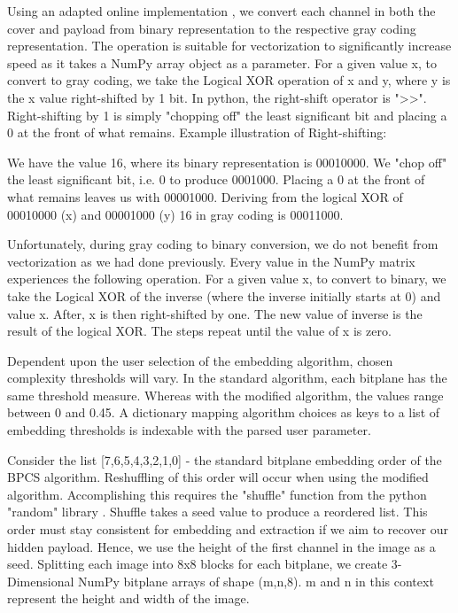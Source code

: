 \documentclass{l4proj}
\begin{document}
Using an adapted online implementation \citep{gray-code-conversion}, we convert each channel in both the cover and payload from binary representation to the respective gray coding representation. The operation is suitable for vectorization to significantly increase speed as it takes a NumPy array object as a parameter.  For a given value x, to convert to gray coding, we take the Logical XOR operation of x and y, where y is the x value right-shifted by 1 bit. In python, the right-shift operator is ">>". Right-shifting by 1 is simply "chopping off" the least significant bit and placing a 0 at the front of what remains. Example illustration of Right-shifting:

We have the value 16, where its binary representation is 00010000. We "chop off" the least significant bit, i.e. 0 to produce 0001000. Placing a 0 at the front of what remains leaves us with 00001000. Deriving from the logical XOR of 00010000 (x) and 00001000 (y) 16 in gray coding is 00011000. 

Unfortunately, during gray coding to binary conversion, we do not benefit from vectorization as we had done previously. Every value in the NumPy matrix experiences the following operation. For a given value x, to convert to binary, we take the Logical XOR of the inverse (where the inverse initially starts at 0) and value x. After, x is then right-shifted by one. The new value of inverse is the result of the logical XOR. The steps repeat until the value of x is zero. 

Dependent upon the user selection of the embedding algorithm, chosen complexity thresholds will vary. In the standard algorithm, each bitplane has the same threshold measure. Whereas with the modified algorithm, the values range between 0 and 0.45. A dictionary mapping algorithm choices as keys to a list of embedding thresholds is indexable with the parsed user parameter. 

Consider the list [7,6,5,4,3,2,1,0] - the standard bitplane embedding order of the BPCS algorithm. Reshuffling of this order will occur when using the modified algorithm. Accomplishing this requires the "shuffle" function from the python "random" library \citep{random}. Shuffle takes a seed value to produce a reordered list. This order must stay consistent for embedding and extraction if we aim to recover our hidden payload. Hence, we use the height of the first channel in the image as a seed. Splitting each image into 8x8 blocks for each bitplane, we create 3-Dimensional NumPy bitplane arrays of shape (m,n,8). m and n in this context represent the height and width of the image.
\end{document}
